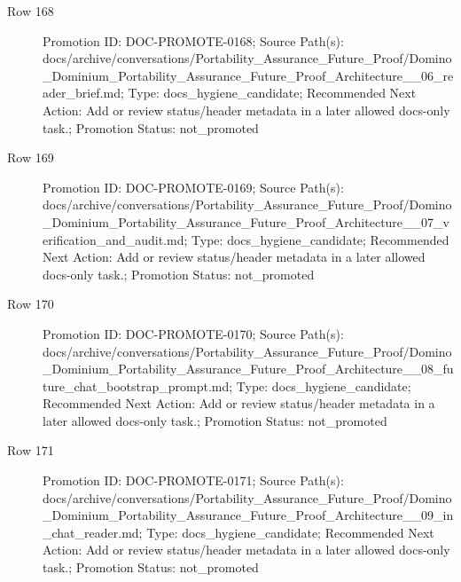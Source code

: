 \documentclass[9pt,a4paper,openany]{book}
\begin{document}
\begin{description}
\item[Row 168] Promotion ID: DOC-\allowbreak{}PROMOTE-\allowbreak{}0168; Source Path(s): docs/\allowbreak{}archive/\allowbreak{}conversations/\allowbreak{}Portability\_\allowbreak{}Assurance\_\allowbreak{}Future\_\allowbreak{}Proof/\allowbreak{}Domino\_\allowbreak{}Dominium\_\allowbreak{}Portability\_\allowbreak{}Assurance\_\allowbreak{}Future\_\allowbreak{}Proof\_\allowbreak{}Architecture\_\allowbreak{}\_\allowbreak{}06\_\allowbreak{}reader\_\allowbreak{}brief.\allowbreak{}md; Type: docs\_\allowbreak{}hygiene\_\allowbreak{}candidate; Recommended Next Action: Add or review status/\allowbreak{}header metadata in a later allowed docs-\allowbreak{}only task.\allowbreak{}; Promotion Status: not\_\allowbreak{}promoted
\item[Row 169] Promotion ID: DOC-\allowbreak{}PROMOTE-\allowbreak{}0169; Source Path(s): docs/\allowbreak{}archive/\allowbreak{}conversations/\allowbreak{}Portability\_\allowbreak{}Assurance\_\allowbreak{}Future\_\allowbreak{}Proof/\allowbreak{}Domino\_\allowbreak{}Dominium\_\allowbreak{}Portability\_\allowbreak{}Assurance\_\allowbreak{}Future\_\allowbreak{}Proof\_\allowbreak{}Architecture\_\allowbreak{}\_\allowbreak{}07\_\allowbreak{}verification\_\allowbreak{}and\_\allowbreak{}audit.\allowbreak{}md; Type: docs\_\allowbreak{}hygiene\_\allowbreak{}candidate; Recommended Next Action: Add or review status/\allowbreak{}header metadata in a later allowed docs-\allowbreak{}only task.\allowbreak{}; Promotion Status: not\_\allowbreak{}promoted
\item[Row 170] Promotion ID: DOC-\allowbreak{}PROMOTE-\allowbreak{}0170; Source Path(s): docs/\allowbreak{}archive/\allowbreak{}conversations/\allowbreak{}Portability\_\allowbreak{}Assurance\_\allowbreak{}Future\_\allowbreak{}Proof/\allowbreak{}Domino\_\allowbreak{}Dominium\_\allowbreak{}Portability\_\allowbreak{}Assurance\_\allowbreak{}Future\_\allowbreak{}Proof\_\allowbreak{}Architecture\_\allowbreak{}\_\allowbreak{}08\_\allowbreak{}future\_\allowbreak{}chat\_\allowbreak{}bootstrap\_\allowbreak{}prompt.\allowbreak{}md; Type: docs\_\allowbreak{}hygiene\_\allowbreak{}candidate; Recommended Next Action: Add or review status/\allowbreak{}header metadata in a later allowed docs-\allowbreak{}only task.\allowbreak{}; Promotion Status: not\_\allowbreak{}promoted
\item[Row 171] Promotion ID: DOC-\allowbreak{}PROMOTE-\allowbreak{}0171; Source Path(s): docs/\allowbreak{}archive/\allowbreak{}conversations/\allowbreak{}Portability\_\allowbreak{}Assurance\_\allowbreak{}Future\_\allowbreak{}Proof/\allowbreak{}Domino\_\allowbreak{}Dominium\_\allowbreak{}Portability\_\allowbreak{}Assurance\_\allowbreak{}Future\_\allowbreak{}Proof\_\allowbreak{}Architecture\_\allowbreak{}\_\allowbreak{}09\_\allowbreak{}in\_\allowbreak{}chat\_\allowbreak{}reader.\allowbreak{}md; Type: docs\_\allowbreak{}hygiene\_\allowbreak{}candidate; Recommended Next Action: Add or review status/\allowbreak{}header metadata in a later allowed docs-\allowbreak{}only task.\allowbreak{}; Promotion Status: not\_\allowbreak{}promoted

\end{description}
\end{document}
